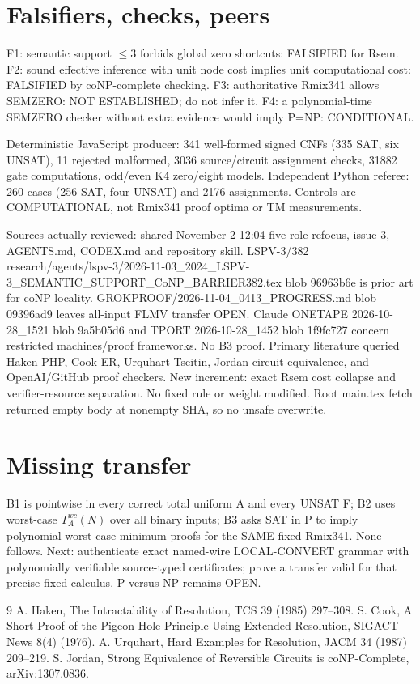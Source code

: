\documentclass[11pt]{article}
\begin{document}
\section*{Falsifiers, checks, peers}
F1: semantic support $\le3$ forbids global zero shortcuts: FALSIFIED for Rsem. F2: sound effective inference with unit node cost implies unit computational cost: FALSIFIED by coNP-complete checking. F3: authoritative Rmix341 allows SEMZERO: NOT ESTABLISHED; do not infer it. F4: a polynomial-time SEMZERO checker without extra evidence would imply P=NP: CONDITIONAL.

Deterministic JavaScript producer: 341 well-formed signed CNFs (335 SAT, six UNSAT), 11 rejected malformed, 3036 source/circuit assignment checks, 31882 gate computations, odd/even K4 zero/eight models. Independent Python referee: 260 cases (256 SAT, four UNSAT) and 2176 assignments. Controls are COMPUTATIONAL, not Rmix341 proof optima or TM measurements.

Sources actually reviewed: shared November 2 12:04 five-role refocus, issue 3, AGENTS.md, CODEX.md and repository skill. LSPV-3/382 research/agents/lspv-3/2026-11-03_2024_LSPV-3_SEMANTIC_SUPPORT_CoNP_BARRIER382.tex blob 96963b6e is prior art for coNP locality. GROKPROOF/2026-11-04_0413_PROGRESS.md blob 09396ad9 leaves all-input FLMV transfer OPEN. Claude ONETAPE 2026-10-28_1521 blob 9a5b05d6 and TPORT 2026-10-28_1452 blob 1f9fc727 concern restricted machines/proof frameworks. No B3 proof. Primary literature queried Haken PHP, Cook ER, Urquhart Tseitin, Jordan circuit equivalence, and OpenAI/GitHub proof checkers. New increment: exact Rsem cost collapse and verifier-resource separation. No fixed rule or weight modified. Root main.tex fetch returned empty body at nonempty SHA, so no unsafe overwrite.

\section*{Missing transfer}
B1 is pointwise in every correct total uniform A and every UNSAT F; B2 uses worst-case $T_A^{wc}(N)$ over all binary inputs; B3 asks SAT in P to imply polynomial worst-case minimum proofs for the SAME fixed Rmix341. None follows. Next: authenticate exact named-wire LOCAL-CONVERT grammar with polynomially verifiable source-typed certificates; prove a transfer valid for that precise fixed calculus. P versus NP remains OPEN.

\begin{thebibliography}{9}
 A. Haken, The Intractability of Resolution, TCS 39 (1985) 297--308.
 S. Cook, A Short Proof of the Pigeon Hole Principle Using Extended Resolution, SIGACT News 8(4) (1976).
 A. Urquhart, Hard Examples for Resolution, JACM 34 (1987) 209--219.
 S. Jordan, Strong Equivalence of Reversible Circuits is coNP-Complete, arXiv:1307.0836.
\end{thebibliography}
\end{document}
